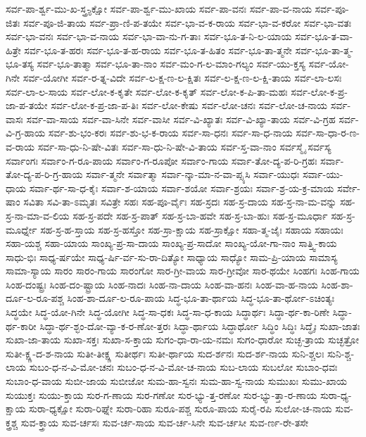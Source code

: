 {ಸರ್ವ-ಪಾ-ರ್ಶ್ವ-ಮು-ಖ-ಸ್ತ್ರ-್ಯಕ್ಷೋ
ಸರ್ವ-ಪಾ-ರ್ಶ್ವ-ಮು-ಖಾಯ
ಸರ್ವ-ಪಾ-ವನಃ
ಸರ್ವ-ಪಾ-ವ-ನಾಯ
ಸರ್ವ-ಪೂ-ಜಿತಃ
ಸರ್ವ-ಪೂ-ಜಿ-ತಾಯ
ಸರ್ವ-ಪ್ರಾ-ಣಿ-ಪ-ತಯೇ
ಸರ್ವ-ಭಾ-ವ-ಕ-ರಾಯ
ಸರ್ವ-ಭಾ-ವ-ಕರೋ
ಸರ್ವ-ಭಾ-ವತಃ
ಸರ್ವ-ಭಾ-ವನಃ
ಸರ್ವ-ಭಾ-ವ-ನಾಯ
ಸರ್ವ-ಭಾ-ವಾ-ನು-ಗ-ತಾಃ
ಸರ್ವ-ಭೂ-ತ-ನಿ-ಲ-ಯಾಯ
ಸರ್ವ-ಭೂ-ತ-ವಾ-ಹಿತ್ರೇ
ಸರ್ವ-ಭೂ-ತ-ಹರಃ
ಸರ್ವ-ಭೂ-ತ-ಹ-ರಾಯ
ಸರ್ವ-ಭೂ-ತ-ಹಿತಂ
ಸರ್ವ-ಭೂ-ತಾ-ತ್ಮನೇ
ಸರ್ವ-ಭೂ-ತಾ-ತ್ಮ-ಭೂ-ತಸ್ಯ
ಸರ್ವ-ಭೂ-ತಾತ್ಮಾ
ಸರ್ವ-ಭೂ-ತಾ-ನಾಂ
ಸರ್ವ-ಮಂ-ಗ-ಲ-ಮಾಂ-ಗಲ್ಯಂ
ಸರ್ವ-ಯು-ಕ್ತಸ್ಯ
ಸರ್ವ-ಯೋ-ಗಿನೇ
ಸರ್ವ-ಯೋಗೀ
ಸರ್ವ-ರ-ತ್ನ-ವಿದೇ
ಸರ್ವ-ಲ-ಕ್ಷ-ಣ-ಲ-ಕ್ಷಿತಃ
ಸರ್ವ-ಲ-ಕ್ಷ-ಣ-ಲ-ಕ್ಷಿ-ತಾಯ
ಸರ್ವ-ಲಾ-ಲಸಃ
ಸರ್ವ-ಲಾ-ಲ-ಸಾಯ
ಸರ್ವ-ಲೋ-ಕ-ಕೃತೇ
ಸರ್ವ-ಲೋ-ಕ-ಕೃತ್
ಸರ್ವ-ಲೋ-ಕ-ಪಿ-ತಾ-ಮಹಃ
ಸರ್ವ-ಲೋ-ಕ-ಪ್ರ-ಜಾ-ಪ-ತಯೇ
ಸರ್ವ-ಲೋ-ಕ-ಪ್ರ-ಜಾ-ಪ-ತಿಃ
ಸರ್ವ-ಲೋ-ಕೇಷು
ಸರ್ವ-ಲೋ-ಚನಃ
ಸರ್ವ-ಲೋ-ಚ-ನಾಯ
ಸರ್ವ-ವಾಸಃ
ಸರ್ವ-ವಾ-ಸಾಯ
ಸರ್ವ-ವಾ-ಸಿನೇ
ಸರ್ವ-ವಾಸೀ
ಸರ್ವ-ವಿ-ಖ್ಯಾತಃ
ಸರ್ವ-ವಿ-ಖ್ಯಾ-ತಾಯ
ಸರ್ವ-ವಿ-ಗ್ರಹ
ಸರ್ವ-ವಿ-ಗ್ರ-ಹಾಯ
ಸರ್ವ-ಶು-ಭಂ-ಕರಃ
ಸರ್ವ-ಶು-ಭ-ಕ-ರಾಯ
ಸರ್ವ-ಸಾ-ಧನಃ
ಸರ್ವ-ಸಾ-ಧ-ನಾಯ
ಸರ್ವ-ಸಾ-ಧಾ-ರ-ಣ-ವ-ರಾಯ
ಸರ್ವ-ಸಾ-ಧು-ನಿ-ಷೇ-ವಿತಃ
ಸರ್ವ-ಸಾ-ಧು-ನಿ-ಷೇ-ವಿ-ತಾಯ
ಸರ್ವ-ಸ್ತ-ವಾ-ನಾಂ
ಸರ್ವಸ್ಮೈ
ಸರ್ವಸ್ಯ
ಸರ್ವಾಂಗಃ
ಸರ್ವಾಂ-ಗ-ರೂ-ಪಾಯ
ಸರ್ವಾಂ-ಗ-ರೂಪೋ
ಸರ್ವಾಂ-ಗಾಯ
ಸರ್ವಾ-ತೋ-ದ್ಯ-ಪ-ರಿ-ಗ್ರಹಃ
ಸರ್ವಾ-ತೋ-ದ್ಯ-ಪ-ರಿ-ಗ್ರ-ಹಾಯ
ಸರ್ವಾ-ತ್ಮನೇ
ಸರ್ವಾತ್ಮಾ
ಸರ್ವಾ-ನ್ಕಾ-ಮಾ-ನ-ವಾ-ಪ್ಸ್ಯಸಿ
ಸರ್ವಾ-ಯುಧಃ
ಸರ್ವಾ-ಯು-ಧಾಯ
ಸರ್ವಾ-ರ್ಥ-ಸಾ-ಧ-ಕೈಃ
ಸರ್ವಾ-ಶ-ಯಾಯ
ಸರ್ವಾ-ಶಯೋ
ಸರ್ವಾ-ಶ್ರಯಃ
ಸರ್ವಾ-ಶ್ರ-ಯ-ಕ್ರ-ಮಾಯ
ಸರ್ವೇ-ಷಾಂ
ಸವಿತಾ
ಸವಿ-ತಾ-ಽಮೃತಃ
ಸವಿತ್ರೇ
ಸಹಃ
ಸಹ-ಪೂ-ರ್ವೈಃ
ಸಹ-ಸ್ರದಃ
ಸಹ-ಸ್ರ-ದಾಯ
ಸಹ-ಸ್ರ-ನಾ-ಮ-ವನ್ನು
ಸಹ-ಸ್ರ-ನಾ-ಮಾ-ವ-ಲಿಯ
ಸಹ-ಸ್ರ-ಪದೇ
ಸಹ-ಸ್ರ-ಪಾತ್
ಸಹ-ಸ್ರ-ಬಾ-ಹವೇ
ಸಹ-ಸ್ರ-ಬಾ-ಹುಃ
ಸಹ-ಸ್ರ-ಮೂರ್ಧಾ
ಸಹ-ಸ್ರ-ಮೂರ್ಧ್ನೇ
ಸಹ-ಸ್ರ-ಹ-ಸ್ತಾಯ
ಸಹ-ಸ್ರ-ಹಸ್ತೋ
ಸಹ-ಸ್ರಾ-ಕ್ಷಾಯ
ಸಹ-ಸ್ರಾಕ್ಷೋ
ಸಹಾ-ತ್ಮ-ಜೈಃ
ಸಹಾಯ
ಸಹಾಯಃ
ಸಹಾ-ಯಶ್ಚ
ಸಹಾ-ಯಾಯ
ಸಾಂಖ್ಯ-ಪ್ರ-ಸಾ-ದಾಯ
ಸಾಂಖ್ಯ-ಪ್ರ-ಸಾದೋ
ಸಾಂಖ್ಯ-ಯೋ-ಗಾ-ನಾಂ
ಸಾತ್ತ್ವಿ-ಕಾಯ
ಸಾಧು-ಭಿಃ
ಸಾಧ್ಯ-ರ್ಷಯೇ
ಸಾಧ್ಯ-ರ್ಷಿ-ರ್ವ-ಸು-ರಾ-ದಿತ್ಯೋ
ಸಾಧ್ಯಾಯ
ಸಾಧ್ಯೋ
ಸಾಮ-ಪ್ರಿ-ಯಾಯ
ಸಾಮಾಸ್ಯ
ಸಾಮಾ-ಸ್ಯಾಯ
ಸಾರಂ
ಸಾರಂ-ಗಾಯ
ಸಾರಂಗೋ
ಸಾರ-ಗ್ರೀ-ವಾಯ
ಸಾರ-ಗ್ರೀವೋ
ಸಾರ-ಥಯೇ
ಸಿಂಹಗಃ
ಸಿಂಹ-ಗಾಯ
ಸಿಂಹ-ದಂಷ್ಟ್ರಃ
ಸಿಂಹ-ದಂ-ಷ್ಟ್ರಾಯ
ಸಿಂಹ-ನಾದಃ
ಸಿಂಹ-ನಾ-ದಾಯ
ಸಿಂಹ-ವಾ-ಹನಃ
ಸಿಂಹ-ವಾ-ಹ-ನಾಯ
ಸಿಂಹ-ಶಾ-ರ್ದೂ-ಲ-ರೂ-ಪಶ್ಚ
ಸಿಂಹ-ಶಾ-ರ್ದೂ-ಲ-ರೂ-ಪಾಯ
ಸಿದ್ಧ-ಭೂ-ತಾ-ರ್ಥಾಯ
ಸಿದ್ಧ-ಭೂ-ತಾ-ರ್ಥೋ-ಽಚಿಂತ್ಯಃ
ಸಿದ್ಧಯೇ
ಸಿದ್ಧ-ಯೋ-ಗಿನೇ
ಸಿದ್ಧ-ಯೋಗೀ
ಸಿದ್ಧ-ಸಾ-ಧಕಃ
ಸಿದ್ಧ-ಸಾ-ಧ-ಕಾಯ
ಸಿದ್ಧಾರ್ಥಃ
ಸಿದ್ಧಾ-ರ್ಥ-ಕಾ-ರಿಣೇ
ಸಿದ್ಧಾ-ರ್ಥ-ಕಾರೀ
ಸಿದ್ಧಾ-ರ್ಥ-ಶ್ಛಂ-ದೋ-ವ್ಯಾ-ಕ-ರ-ಣೋ-ತ್ತರಃ
ಸಿದ್ಧಾ-ರ್ಥಾಯ
ಸಿದ್ಧಾರ್ಥೋ
ಸಿದ್ಧಿಂ
ಸಿದ್ಧಿಃ
ಸಿದ್ಧೈಃ
ಸುಖಾ-ಜಾತಃ
ಸುಖಾ-ಜಾ-ತಾಯ
ಸುಖಾ-ಸಕ್ತಃ
ಸುಖಾ-ಸ-ಕ್ತಾಯ
ಸುಗಂ-ಧಾ-ರಾ-ಯ-ನಮಃ
ಸುಗಂ-ಧಾರೋ
ಸುಚ್ಛ-ತ್ರಾಯ
ಸುಚ್ಛತ್ರೋ
ಸುತೀ-ಕ್ಷ್ಣ-ದ-ಶ-ನಾಯ
ಸುತೀ-ತೀಕ್ಷ್ಣ
ಸುತೀರ್ಥಃ
ಸುತೀ-ರ್ಥಾಯ
ಸುದ-ರ್ಶನಃ
ಸುದ-ರ್ಶ-ನಾಯ
ಸುನಿ-ಶ್ಚಲಃ
ಸುನಿ-ಶ್ಚ-ಲಾಯ
ಸುಬಂ-ಧ-ನ-ವಿ-ಮೋ-ಚನಃ
ಸುಬಂ-ಧ-ನ-ವಿ-ಮೋ-ಚ-ನಾಯ
ಸುಬ-ಲಾಯ
ಸುಬಲೋ
ಸುಬಾಂ-ಧವಃ
ಸುಬಾಂ-ಧ-ವಾಯ
ಸುಬೀ-ಜಾಯ
ಸುಬೀಜೋ
ಸುಮ-ಹಾ-ಸ್ವನಃ
ಸುಮ-ಹಾ-ಸ್ವ-ನಾಯ
ಸುಮುಖಃ
ಸುಮು-ಖಾಯ
ಸುಯುಕ್ತಃ
ಸುಯು-ಕ್ತಾಯ
ಸುರ-ಗ-ಣಾಯ
ಸುರ-ಗಣೋ
ಸುರ-ಭ್ಯು-ತ್ತ-ರಣೋ
ಸುರ-ಭ್ಯು-ತ್ತಾ-ರ-ಣಾಯ
ಸುರಾ-ಧ್ಯ-ಕ್ಷಾಯ
ಸುರಾ-ಧ್ಯಕ್ಷೋ
ಸುರಾ-ರಿಘ್ನೇ
ಸುರಾ-ರಿಹಾ
ಸುರೂ-ಪಶ್ಚ
ಸುರೂ-ಪಾಯ
ಸುರೈ-ರಪಿ
ಸುಲೋ-ಚ-ನಾಯ
ಸುವ-ಕ್ತ್ರಶ್ಚ
ಸುವ-ಕ್ತ್ರಾಯ
ಸುವ-ರ್ಚಸಃ
ಸುವ-ರ್ಚ-ಸಾಯ
ಸುವ-ರ್ಚ-ಸಿನೇ
ಸುವ-ರ್ಚಸೀ
ಸುವ-ರ್ಣ-ರೇ-ತಸೇ
}
